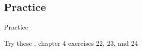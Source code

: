 \documentclass{beamer}
\newcommand{\subtwothree}{Practice}
\begin{document}
    \subsection{\subtwothree}
      \begin{frame}{\subtwothree}
        \begin{block}{Try these}
          \textcite{dawson_language_2016}, chapter 4 exercises 22, 23, and 24
        \end{block}
      \end{frame}
\end{document}
